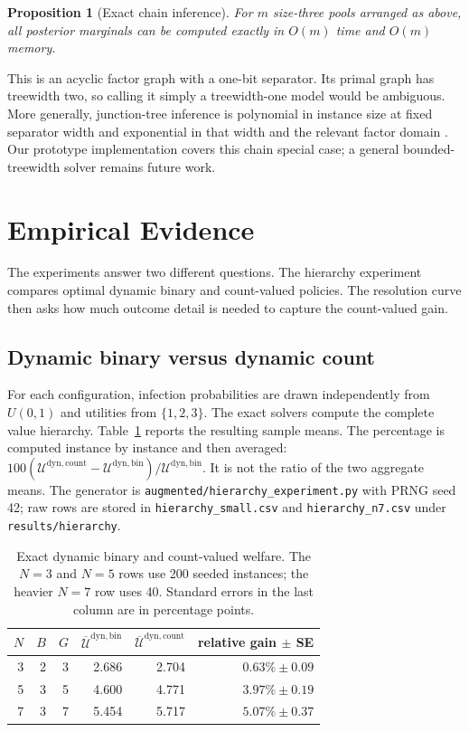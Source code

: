 \documentclass[11pt]{article}
\newtheorem{proposition}{Proposition}
\begin{document}
\begin{proposition}[Exact chain inference]
For $m$ size-three pools arranged as above, all posterior marginals can be
computed exactly in $O(m)$ time and $O(m)$ memory.
\end{proposition}

This is an acyclic factor graph with a one-bit separator. Its primal graph has
treewidth two, so calling it simply a treewidth-one model would be ambiguous.
More generally, junction-tree inference is polynomial in instance size at
fixed separator width and exponential in that width and the relevant factor
domain \cite{lauritzen1988}. Our prototype implementation covers this chain
special case; a general bounded-treewidth solver remains future work.

\section{Empirical Evidence}
\label{sec:empirical}

The experiments answer two different questions. The hierarchy experiment
compares optimal dynamic binary and count-valued policies. The resolution curve
then asks how much outcome detail is needed to capture the count-valued gain.

\subsection{Dynamic binary versus dynamic count}

For each configuration, infection probabilities are drawn independently from
$U(0,1)$ and utilities from $\{1,2,3\}$. The exact solvers compute the complete
value hierarchy. Table~\ref{tab:hierarchy} reports the resulting sample means.
The percentage is computed instance by instance and then averaged:
$100(\mathcal U^{\mathrm{dyn,count}}-\mathcal U^{\mathrm{dyn,bin}})/
\mathcal U^{\mathrm{dyn,bin}}$. It is not the ratio of the two aggregate means.
The generator is \texttt{augmented/hierarchy\_experiment.py} with PRNG seed 42;
raw rows are stored in \texttt{hierarchy\_small.csv} and
\texttt{hierarchy\_n7.csv} under \texttt{results/hierarchy}.

\begin{table}[t]
\centering
\caption{Exact dynamic binary and count-valued welfare. The $N=3$ and $N=5$
rows use 200 seeded instances; the heavier $N=7$ row uses 40. Standard errors
in the last column are in percentage points.}
\label{tab:hierarchy}
\small
\begin{tabular}{rrrrrr}
\toprule
$N$ & $B$ & $G$ & $\overline{\mathcal U}^{\mathrm{dyn,bin}}$
& $\overline{\mathcal U}^{\mathrm{dyn,count}}$ & relative gain $\pm$ SE \\
\midrule
3 & 2 & 3 & 2.686 & 2.704 & $0.63\%\pm0.09$ \\
5 & 3 & 5 & 4.600 & 4.771 & $3.97\%\pm0.19$ \\
7 & 3 & 7 & 5.454 & 5.717 & $5.07\%\pm0.37$ \\
\bottomrule
\end{tabular}
\end{table}
\end{document}
